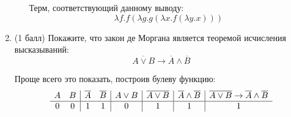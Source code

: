 \begin{enumerate}
\begin{itemize}
    \begin{solution}
      \hspace{0.01cm}
      \begin{prooftree}
      \end{prooftree}
      Терм, соответствующий данному выводу:
      \begin{equation}
        \lambda f. f (\lambda g. g (\lambda x . f (\lambda y . x)))
      \end{equation}
    \end{solution}
  \end{itemize}
  \item (1 балл) Покажите, что закон де Моргана является теоремой исчисления высказываний:
  $$\overline{A \lor B} \rightarrow \overline{A} \land \overline{B}$$
  \begin{solution}
    Проще всего это показать, построив булеву функцию:
    \begin{displaymath}
      \begin{array}{c c|c c|c|c|c|c}
        A & B & \overline{A} & \overline{B} & A \lor B & \overline{A \lor B} & \overline{A} \land \overline{B} & \overline{A \lor B} \rightarrow \overline{A} \land \overline{B}\\
        \hline
        0 & 0 & 1 & 1 & 0 & 1 & 1 & 1\\

\end{array}
\end{displaymath}
\end{solution}
\end{enumerate}
